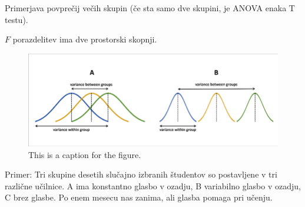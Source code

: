 Primerjava povprečij večih skupin (če sta samo dve skupini, je ANOVA enaka T testu).

$F$ porazdelitev ima dve prostorski skopnji.

\begin{figure}[h]
    \centering
    \includegraphics[width=\textwidth]{pictures/anova_varianca.png}
    \caption{This is a caption for the figure.}
    \label{fig:anova_varianca}
\end{figure}

Primer: Tri skupine desetih slučajno izbranih študentov so postavljene v tri različne učilnice. A ima konstantno glasbo v ozadju, B variabilno glasbo v ozadju, C brez glasbe. Po enem mesecu nas zanima, ali glasba pomaga pri učenju.

